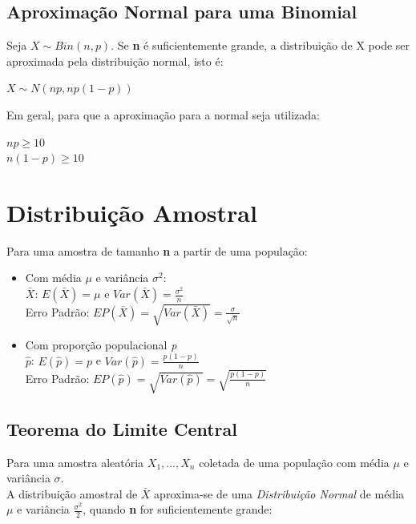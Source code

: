\documentclass[a4paper, 12pt]{article}
\begin{document}
\subsection{Aproximação Normal para uma Binomial}
	Seja $X \sim Bin(n,p)$. Se \textbf{n} é suficientemente grande, a distribuição de X pode ser aproximada pela distribuição normal, isto é:
	\begin{center}
		\Large
		$
		X \sim N(np,np(1-p))
		$
	\end{center}
	Em geral, para que a aproximação para a normal seja utilizada:
	\begin{center}
		\Large
		$
		np\geq 10
		$\\
		$
		n(1-p)\geq 10
		$
	\end{center}
	
\section{Distribuição Amostral}
	Para uma amostra de tamanho \textbf{n} a partir de uma população:
	\begin{itemize}
		\item Com média $\mu$ e variância $\sigma^2$:\\
		$\bar{X}$: $E(\bar{X}) = \mu$ e $Var(\bar{X}) = \frac{\sigma^2}{n}$\\
		Erro Padrão: $EP(\bar{X}) = \sqrt{Var(\bar{X})} = \frac{\sigma}{\sqrt{n}}$
		
		
		\item Com proporção populacional \textit{p}\\
		$\hat{p}$: $E(\hat{p}) = p$ e $Var(\hat{p}) = \frac{p(1-p)}{n}$\\
		Erro Padrão: $EP(\hat{p})=\sqrt{Var(\hat{p})}=\sqrt{\frac{p(1-p)}{n}}$
	\end{itemize}

\subsection{Teorema do Limite Central}
	Para uma amostra aleatória $X_1, ..., X_n$ coletada de uma população com média $\mu$ e variância $\sigma$.\\
	
	A distribuição amostral de $\bar{X}$ aproxima-se de uma \textit{Distribuição Normal} de média $\mu$ e variância $\frac{\sigma^2}{2}$, quando \textbf{n} for suficientemente grande:
	
\end{document}
